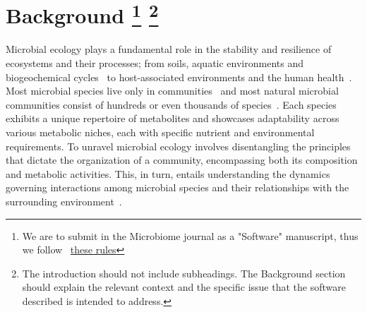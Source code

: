 \documentclass[sn-mathphys,Numbered, lineno]{sn-jnl}  %
\theoremstyle{thmstyleone}%
\theoremstyle{thmstyletwo}%
\theoremstyle{thmstylethree}%
\begin{document}
\maketitle




\section*{
    Background
    \footnote{
        We are to submit in the Microbiome journal as a "Software" manuscript, thus we follow
        ~\href{https://microbiomejournal.biomedcentral.com/submission-guidelines/preparing-your-manuscript/software-article}{these rules}
    }
    \footnote{
        The introduction should not include subheadings.
        The Background section should explain the relevant context and the specific issue that the software described is intended to address.
        }
}
\label{sec1}




    Microbial ecology plays a fundamental role in the stability and resilience of ecosystems and their processes; from soils, aquatic environments and biogeochemical cycles~\cite{yuan2021climate} to host-associated environments and the human health~\cite{raes2008molecular, faust2012microbialReviewInteractions}.
    Most microbial species live only in communities~\cite{rottjers2018hairballs} and most natural microbial communities consist of hundreds or even thousands of species~\cite{balint2016millions}.
    Each species exhibits a unique repertoire of metabolites and showcases adaptability across various metabolic niches, each with specific nutrient and environmental requirements.
    To unravel microbial ecology involves disentangling the principles that dictate the organization of a community, encompassing both its composition and metabolic activities. This, in turn, entails understanding the dynamics governing interactions among microbial species and their relationships with the surrounding environment~\cite{robinson2010structure}.
\end{document}
